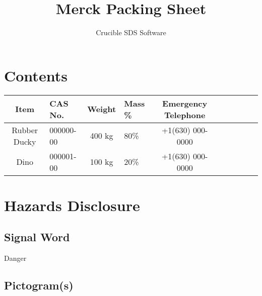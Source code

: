 \documentclass[letterpaper, 11pt]{article}
\title{Merck Packing Sheet}
\author{Crucible SDS Software}
\def\pictGhsCompressedGas{ }
\def\pictGhsHarmful{ }
\begin{document}


\section*{Contents}

\begin{tabular}{ Sl|Sl|Sl|Sl|Sl }
    \textbf{Item}&\textbf{CAS No.}&\textbf{Weight}&\textbf{Mass \%}&\textbf{Emergency Telephone}\\
    \hline
    Rubber Ducky&000000-00&400 kg&80\%&+1(630) 000-0000\\
    Dino&000001-00&100 kg&20\%&+1(630) 000-0000\\
    
\end{tabular}

\section*{Hazards Disclosure}
\subsection*{Signal Word}
Danger
\subsection*{Pictogram(s)}

\pictGhsCompressedGas\pictGhsHarmful
\end{document}
